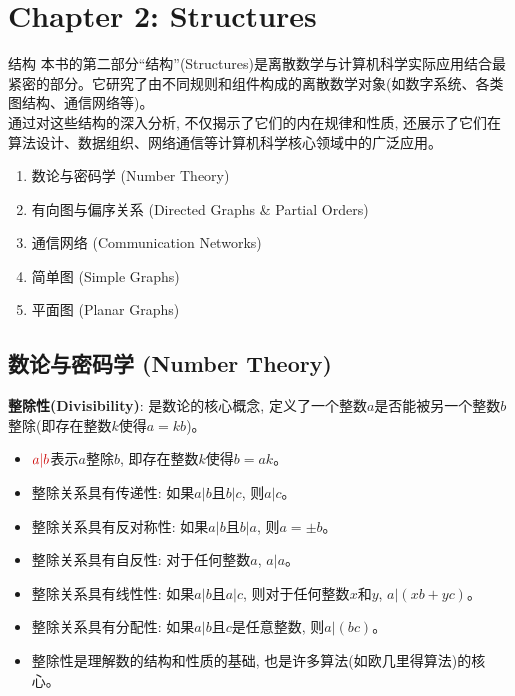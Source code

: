 \documentclass[12pt, a4paper, UTF8]{ctexart}
\newcommand{\term}[1]{\textbf{\textcolor{blue!80!black}{#1}}}
\newcommand{\mhl}[1]{\textcolor{red!80!black}{#1}}
\begin{document}
\begin{sloppypar}
    \newpage
    \section{Chapter 2: Structures}
    \begin{chaptersummary}{结构}
        本书的第二部分“结构”(Structures)是离散数学与计算机科学实际应用结合最紧密的部分。它研究了由不同规则和组件构成的离散数学对象(如数字系统、各类图结构、通信网络等)。\\
        通过对这些结构的深入分析, 不仅揭示了它们的内在规律和性质, 还展示了它们在算法设计、数据组织、网络通信等计算机科学核心领域中的广泛应用。
        \tcbline %
        \begin{enumerate}[nosep]
            \item 数论与密码学 (Number Theory)
            \item 有向图与偏序关系 (Directed Graphs \& Partial Orders)
            \item 通信网络 (Communication Networks)
            \item 简单图 (Simple Graphs)
            \item 平面图 (Planar Graphs)
        \end{enumerate}
    \end{chaptersummary}

    \subsection{数论与密码学 (Number Theory)}
    \term{整除性(Divisibility)}: 是数论的核心概念, 定义了一个整数$a$是否能被另一个整数$b$整除(即存在整数$k$使得$a = kb$)。
    \begin{itemize}[nosep]
        \item $\mhl{a | b}$表示$a$整除$b$, 即存在整数$k$使得$b = ak$。
        \item 整除关系具有传递性: 如果$a | b$且$b | c$, 则$a | c$。
        \item 整除关系具有反对称性: 如果$a | b$且$b | a$, 则$a = \pm b$。
        \item 整除关系具有自反性: 对于任何整数$a$, $a | a$。
        \item 整除关系具有线性性: 如果$a | b$且$a | c$, 则对于任何整数$x$和$y$, $a | (xb + yc)$。
        \item 整除关系具有分配性: 如果$a | b$且$c$是任意整数, 则$a | (bc)$。
        \item 整除性是理解数的结构和性质的基础, 也是许多算法(如欧几里得算法)的核心。
    \end{itemize}


\end{sloppypar}
\end{document}
